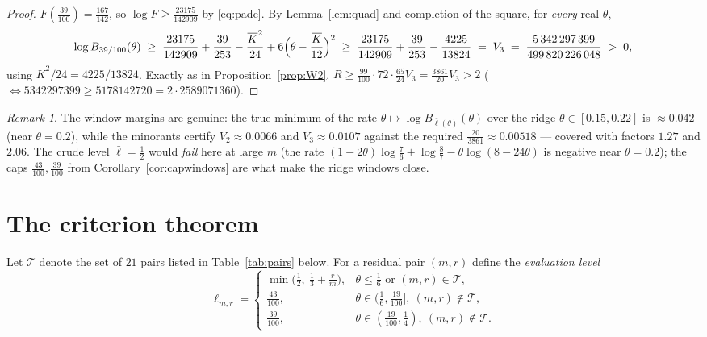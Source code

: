 \documentclass[11pt]{amsart}
\theoremstyle{remark}
\newtheorem{remark}[theorem]{Remark}
\newcommand{\lbar}{\bar\ell}
\begin{document}
\begin{proof}
$F(\tfrac{39}{100})=\tfrac{167}{142}$, so $\log F\ge\tfrac{23175}{142909}$ by \eqref{eq:pade}.  By Lemma~\ref{lem:quad} and completion of the square, for \emph{every} real $\theta$,
\[
        \log B_{39/100}(\theta)
        \;\ge\;\frac{23175}{142909}+\frac{39}{253}
        -\frac{\overline K^2}{24}
        +6\Bigl(\theta-\frac{\overline K}{12}\Bigr)^2
        \;\ge\;\frac{23175}{142909}+\frac{39}{253}-\frac{4225}{13824}
        \;=\;V_3\;=\;\frac{5\,342\,297\,399}{499\,820\,226\,048}\;>\;0,
\]
using $\overline K^2/24=4225/13824$.  Exactly as in Proposition~\ref{prop:W2},
$R\ge\tfrac{99}{100}\cdot72\cdot\tfrac{65}{24}V_3=\tfrac{3861}{20}V_3>2$
($\iff5342297399\ge5178142720=2\cdot2589071360$).
\end{proof}

\begin{remark}
The window margins are genuine: the true minimum of the rate $\theta\mapsto\log B_{\lbar(\theta)}(\theta)$ over the ridge $\theta\in[0.15,0.22]$ is $\approx0.042$ (near $\theta=0.2$), while the minorants certify $V_2\approx0.0066$ and $V_3\approx0.0107$ against the required $\tfrac{20}{3861}\approx0.00518$ --- covered with factors $1.27$ and $2.06$.  The crude level $\lbar=\tfrac12$ would \emph{fail} here at large $m$ (the rate $(1-2\theta)\log\tfrac76+\log\tfrac87-\theta\log(8-24\theta)$ is negative near $\theta=0.2$); the caps $\tfrac{43}{100},\tfrac{39}{100}$ from Corollary~\ref{cor:capwindows} are what make the ridge windows close.
\end{remark}

\section{The criterion theorem}\label{sec:crit}

Let $\mathcal T$ denote the set of $21$ pairs listed in Table~\ref{tab:pairs} below.  For a residual pair $(m,r)$ define the \emph{evaluation level}
\begin{equation}\label{eq:lbar}
        \lbar_{m,r}=
        \begin{cases}
        \min\bigl(\tfrac12,\ \tfrac13+\tfrac rm\bigr), & \theta\le\tfrac16
                \text{ or } (m,r)\in\mathcal T,\\[1mm]
        \tfrac{43}{100}, & \theta\in(\tfrac16,\tfrac{19}{100}],\ (m,r)\notin\mathcal T,\\[1mm]
        \tfrac{39}{100}, & \theta\in(\tfrac{19}{100},\tfrac14),\ (m,r)\notin\mathcal T .
        \end{cases}
\end{equation}
\end{document}
